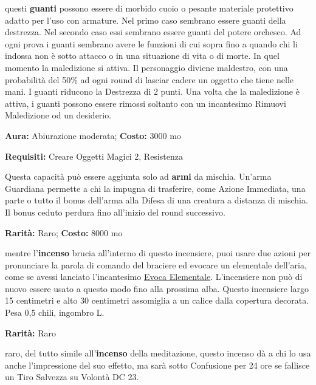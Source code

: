 \begin{multicols}{2}

questi \textbf{guanti} possono essere di morbido cuoio o pesante materiale protettivo adatto per l'uso con armature. Nel primo caso sembrano essere guanti della destrezza. Nel secondo caso essi sembrano essere guanti del potere orchesco. Ad ogni prova i guanti sembrano avere le funzioni di cui sopra fino a quando chi li indossa non è sotto attacco o in una situazione di vita o di morte. In quel momento la maledizione si attiva. Il personaggio diviene maldestro, con una probabilità del 50\% ad ogni round di lasciar cadere un oggetto che tiene nelle mani. I guanti riducono la Destrezza di 2 punti. Una volta che la maledizione è attiva, i guanti possono essere rimossi soltanto con un incantesimo Rimuovi Maledizione od un desiderio.


\textbf{Aura:} Abiurazione moderata; \textbf{Costo:} 3000 mo

\textbf{Requisiti:} Creare Oggetti Magici 2, Resistenza

Questa capacità può essere aggiunta solo ad \textbf{armi} da mischia. Un'arma Guardiana permette a chi la impugna di trasferire, come Azione Immediata, una parte o tutto il bonus dell'arma alla Difesa di una creatura a distanza di mischia. Il bonus ceduto perdura fino all'inizio del round successivo.


\textbf{Rarità:} Raro; \textbf{Costo:} 8000 mo

mentre l'\textbf{incenso} brucia all'interno di questo incensiere, puoi usare due azioni per pronunciare la parola di comando del braciere ed evocare un elementale dell'aria, come se avessi lanciato l'incantesimo \hyperlink{Evoca Elementale}{Evoca Elementale}. L'incensiere non può di nuovo essere usato a questo modo fino alla prossima alba. Questo incensiere largo 15 centimetri e alto 30 centimetri assomiglia a un calice dalla copertura decorata. Pesa 0,5 chili, ingombro L.


\textbf{Rarità:} Raro

raro, del tutto simile all'\textbf{incenso} della meditazione, questo incenso dà a chi lo usa anche l'impressione del suo effetto, ma sarà sotto Confusione per 24 ore se fallisce un Tiro Salvezza su Volontà DC 23.



\end{multicols}
